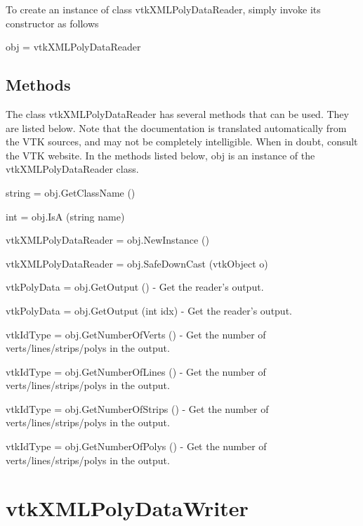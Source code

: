 To create an instance of class vtk\-X\-M\-L\-Poly\-Data\-Reader, simply invoke its constructor as follows \begin{DoxyVerb}  obj = vtkXMLPolyDataReader
\end{DoxyVerb}
 \hypertarget{vtkwidgets_vtkxyplotwidget_Methods}{}\subsection{Methods}\label{vtkwidgets_vtkxyplotwidget_Methods}
The class vtk\-X\-M\-L\-Poly\-Data\-Reader has several methods that can be used. They are listed below. Note that the documentation is translated automatically from the V\-T\-K sources, and may not be completely intelligible. When in doubt, consult the V\-T\-K website. In the methods listed below, {\ttfamily obj} is an instance of the vtk\-X\-M\-L\-Poly\-Data\-Reader class. 
\begin{DoxyItemize}
\item {\ttfamily string = obj.\-Get\-Class\-Name ()}  
\item {\ttfamily int = obj.\-Is\-A (string name)}  
\item {\ttfamily vtk\-X\-M\-L\-Poly\-Data\-Reader = obj.\-New\-Instance ()}  
\item {\ttfamily vtk\-X\-M\-L\-Poly\-Data\-Reader = obj.\-Safe\-Down\-Cast (vtk\-Object o)}  
\item {\ttfamily vtk\-Poly\-Data = obj.\-Get\-Output ()} -\/ Get the reader's output.  
\item {\ttfamily vtk\-Poly\-Data = obj.\-Get\-Output (int idx)} -\/ Get the reader's output.  
\item {\ttfamily vtk\-Id\-Type = obj.\-Get\-Number\-Of\-Verts ()} -\/ Get the number of verts/lines/strips/polys in the output.  
\item {\ttfamily vtk\-Id\-Type = obj.\-Get\-Number\-Of\-Lines ()} -\/ Get the number of verts/lines/strips/polys in the output.  
\item {\ttfamily vtk\-Id\-Type = obj.\-Get\-Number\-Of\-Strips ()} -\/ Get the number of verts/lines/strips/polys in the output.  
\item {\ttfamily vtk\-Id\-Type = obj.\-Get\-Number\-Of\-Polys ()} -\/ Get the number of verts/lines/strips/polys in the output.  
\end{DoxyItemize}\hypertarget{vtkio_vtkxmlpolydatawriter}{}\section{vtk\-X\-M\-L\-Poly\-Data\-Writer}\label{vtkio_vtkxmlpolydatawriter}
